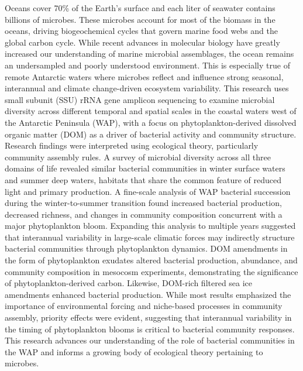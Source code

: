 \documentclass[final,letter,oneside,
12pt, %
doublespacing, %
]{brownthesis} %
\begin{document}




Oceans cover 70\% of the Earth’s surface and each liter of seawater contains billions of microbes. These microbes account for most of the biomass in the oceans, driving biogeochemical cycles that govern marine food webs and the global carbon cycle. While recent advances in molecular biology have greatly increased our understanding of marine microbial assemblages, the ocean remains an undersampled and poorly understood environment. This is especially true of remote Antarctic waters where microbes reflect and influence strong seasonal, interannual and climate change-driven ecosystem variability. This research uses small subunit (SSU) rRNA gene amplicon sequencing to examine microbial diversity across different temporal and spatial scales in the coastal waters west of the Antarctic Peninsula (WAP), with a focus on phytoplankton-derived dissolved organic matter (DOM) as a driver of bacterial activity and community structure. Research findings were interpreted using ecological theory, particularly community assembly rules. A survey of microbial diversity across all three domains of life revealed similar bacterial communities in winter surface waters and summer deep waters, habitats that share the common feature of reduced light and primary production. A fine-scale analysis of WAP bacterial succession during the winter-to-summer transition found increased bacterial production, decreased richness, and changes in community composition concurrent with a major phytoplankton bloom. Expanding this analysis to multiple years suggested that interannual variability in large-scale climatic forces may indirectly structure bacterial communities through phytoplankton dynamics. DOM amendments in the form of phytoplankton exudates altered bacterial production, abundance, and community composition in mesocosm experiments, demonstrating the significance of phytoplankton-derived carbon. Likewise, DOM-rich filtered sea ice amendments enhanced bacterial production. While most results emphasized the importance of environmental forcing and niche-based processes in community assembly, priority effects were evident, suggesting that interannual variability in the timing of phytoplankton blooms is critical to bacterial community responses. This research advances our understanding of the role of bacterial communities in the WAP and informs a growing body of ecological theory pertaining to microbes. 
\end{document}
